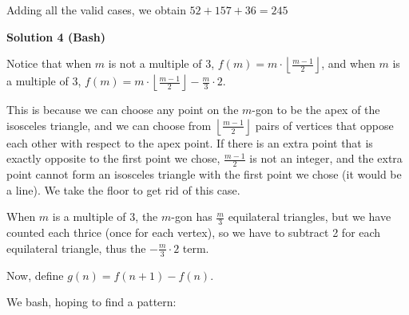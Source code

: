 \begin{enumerate}
 Adding all the valid cases, we obtain $52+157+36=\boxed{245}$




\textbf{Solution 4 (Bash)}

Notice that when $m$ is not a multiple of $3$, $f(m)=m\cdot \left\lfloor \frac{m-1}{2} \right\rfloor$, and when $m$ is a multiple of $3$, $f(m)=m\cdot \left\lfloor \frac{m-1}{2} \right\rfloor-\frac{m}{3}\cdot 2$.

 This is because we can choose any point on the $m$-gon to be the apex of the isosceles triangle, and we can choose from $\left\lfloor \frac{m-1}{2} \right\rfloor$ pairs of vertices that oppose each other with respect to the apex point. If there is an extra point that is exactly opposite to the first point we chose, $\frac{m-1}{2}$ is not an integer, and the extra point cannot form an isosceles triangle with the first point we chose (it would be a line). We take the floor to get rid of this case. 

 When $m$ is a multiple of $3$, the $m$-gon has $\frac{m}{3}$ equilateral triangles, but we have counted each thrice (once for each vertex), so we have to subtract 2 for each equilateral triangle, thus the $-\frac{m}{3}\cdot 2$ term.

 Now, define $g(n)=f(n+1)-f(n)$.

 We bash, hoping to find a pattern:


\end{enumerate}
